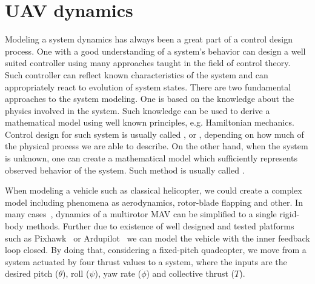 \section{UAV dynamics}

Modeling a system dynamics has always been a great part of a control design process. One with a good understanding of a system's behavior can design a well suited controller using many approaches taught in the field of control theory. Such controller can reflect known characteristics of the system and can appropriately react to evolution of system states. There are two fundamental approaches to the system modeling. One is based on the knowledge about the physics involved in the system. Such knowledge can be used to derive a mathematical model using well known principles, e.g. Hamiltonian mechanics. Control design for such system is usually called , or , depending on how much of the physical process we are able to describe. On the other hand, when the system is unknown, one can create a mathematical model which sufficiently represents observed behavior of the system. Such method is usually called .

When modeling a vehicle such as classical helicopter, we could create a complex model including phenomena as aerodynamics, rotor-blade flapping and other. In many cases~\citep{alexis2014robust}\citep{mahony2012multirotor}, dynamics of a multirotor MAV can be simplified to a single rigid-body methods. Further due to existence of well designed and tested platforms such as Pixhawk~\citep{pixhawk} or Ardupilot~\citep{ardupilot} we can model the vehicle with the inner feedback loop closed. By doing that, considering a fixed-pitch quadcopter, we move from a system actuated by four thrust values to a system, where the inputs are the desired pitch ($\theta$), roll ($\psi$), yaw rate ($\dot{\phi}$) and collective thrust ($T$). 
